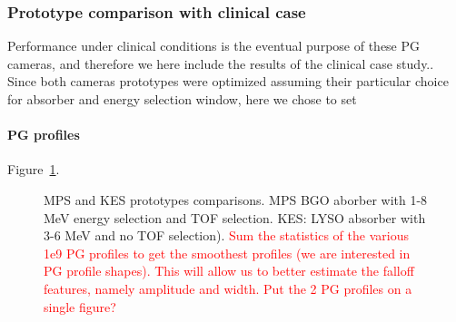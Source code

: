 \documentclass[a4paper,english]{article}
\begin{document}
\subsubsection{Prototype comparison with clinical case}

Performance under clinical conditions is the eventual purpose of these PG cameras, and therefore we here include the results of the clinical case study.. Since both cameras prototypes were optimized assuming their particular choice for absorber and energy selection window, here we chose to set 

\paragraph{PG profiles}

Figure~\ref{PGprofileProtoComp}.

\begin{figure}[!htp]
  \centering
  \quad
  \caption{\label{PGprofileProtoComp} MPS and KES prototypes comparisons. MPS BGO aborber with 1-8 MeV energy selection and TOF selection. KES: LYSO absorber with 3-6 MeV and no TOF selection). \textcolor{red}{Sum the statistics of the various 1e9 PG profiles to get the smoothest profiles (we are interested in PG profile shapes). This will allow us to better estimate the falloff features, namely amplitude and width. Put the 2 PG profiles on a single figure?}}
\end{figure}  
\end{document}

